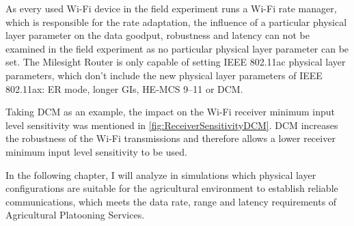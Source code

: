 As every used Wi-Fi device in the field experiment runs a Wi-Fi rate manager, which is responsible for the rate adaptation,
the influence of a particular physical layer parameter on the data goodput, robustness and latency can not be examined in the field experiment as no particular physical layer parameter can be set.
The Milesight Router is only capable of setting IEEE 802.11ac physical layer parameters, which don't include the new physical layer parameters of IEEE 802.11ax:
\ac{ER} mode, longer \ac{GI}s, \ac{HE}-\ac{MCS} \numrange{9}{11} or \ac{DCM}.

Taking \ac{DCM} as an example, the impact on the Wi-Fi receiver minimum input level sensitivity was mentioned in \autoref{fig:ReceiverSensitivityDCM}. \ac{DCM}
increases the robustness of the Wi-Fi transmissions and therefore allows a lower receiver minimum input level sensitivity to be used.

In the following chapter, I will analyze in simulations which physical layer
configurations are suitable for the agricultural environment to establish reliable communications,
which meets the data rate, range and latency requirements of Agricultural Platooning Services.

